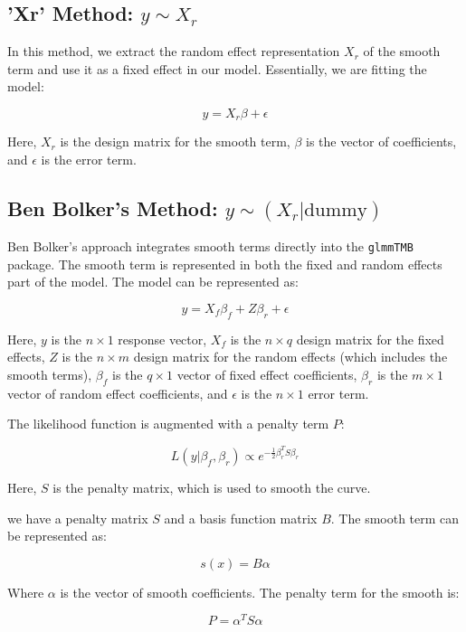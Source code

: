 \documentclass[12pt, twoside,hidelinks]{article}
\theoremstyle{definition}
\numberwithin{equation}{section}
\begin{document}
\subsection{'Xr' Method: \(y \sim X_r\)}

In this method, we extract the random effect representation \(X_r\) of the smooth term and use it as a fixed effect in our model. Essentially, we are fitting the model:

\begin{equation}
y = X_r \beta + \epsilon
\end{equation}

Here, \(X_r\) is the design matrix for the smooth term, \(\beta\) is the vector of coefficients, and \(\epsilon\) is the error term.

\subsection{Ben Bolker's Method: \(y \sim (X_r | \text{dummy})\)}

Ben Bolker's approach integrates smooth terms directly into the \texttt{glmmTMB} package. The smooth term is represented in both the fixed and random effects part of the model. The model can be represented as:

\[
y = X_f \beta_f + Z \beta_r + \epsilon
\]

Here, \(y\) is the \(n \times 1\) response vector, \(X_f\) is the \(n \times q\) design matrix for the fixed effects, \(Z\) is the \(n \times m\) design matrix for the random effects (which includes the smooth terms), \(\beta_f\) is the \(q \times 1\) vector of fixed effect coefficients, \(\beta_r\) is the \(m \times 1\) vector of random effect coefficients, and \(\epsilon\) is the \(n \times 1\) error term.

The likelihood function is augmented with a penalty term \(P\):

\[
L(y | \beta_f, \beta_r) \propto e^{-\frac{1}{2} \beta_r^T S \beta_r}
\]

Here, \(S\) is the penalty matrix, which is used to smooth the curve.

we have a penalty matrix \(S\) and a basis function matrix \(B\). The smooth term can be represented as:

\[
s(x) = B \alpha
\]

Where \( \alpha \) is the vector of smooth coefficients. The penalty term for the smooth is:

\[
P = \alpha^T S \alpha
\]
\end{document}

